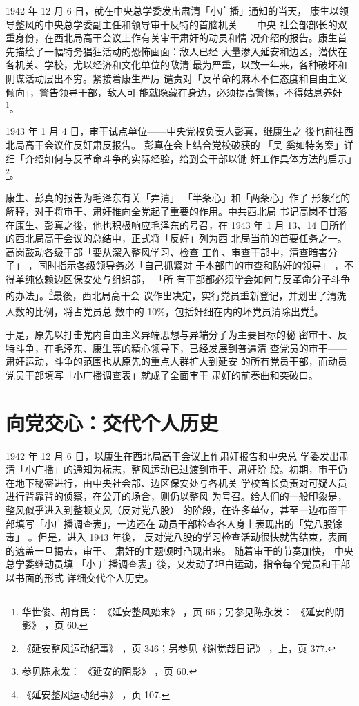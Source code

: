 1942 年 12 月 6 日，就在中央总学委发出肃清「小广播」通知的当天，
康生以领导整风的中央总学委副主任和领导审干反特的首脑机关——中央
社会部部长的双重身份，在西北局高干会议上作有关审干肃奸的动员和情
况介绍的报告。康生首先描绘了一幅特务猖狂活动的恐怖画面：敌人已经
大量渗入延安和边区，潜伏在各机关、学校，尤以经济和文化单位的敌清
最为严重，以致一年来，各种破坏和阴谋活动层出不穷。紧接着康生严厉
谴责对「反革命的麻木不仁态度和自由主义倾向」，警告领导干部，敌人可
能就隐藏在身边，必须提高警惕，不得姑息养奸\footnote{华世俊、胡育民：
《延安整风始末》
，页 66；另参见陈永发：
《延安的阴影》
，页 60.}。

1943 年 1 月 4 日，审干试点单位——中央党校负责人彭真，继康生之
後也前往西北局高干会议作反奸肃反报告。
彭真在会上结合党校破获的
「吴
奚如特务案」详细「介绍如何与反革命斗争的实际经验，给到会干部以锄
奸工作具体方法的启示」\footnote{《延安整风运动纪事》
，页 346；另参见《谢觉哉日记》
，上，页 377.}。

康生、彭真的报告为毛泽东有关「弄清」
「半条心」和「两条心」作了
形象化的解释，对于将审干、肃奸推向全党起了重要的作用。中共西北局
书记高岗不甘落在康生、彭真之後，他也积极响应毛泽东的号召，在 1943
年 1 月 13、14 日所作的西北局高干会议的总结中，正式将「反奸」列为西
北局当前的首要任务之一。高岗鼓动各级干部「要从深入整风学习、检查
工作、审查干部中，清查暗害分子」
，同时指示各级领导务必「自己抓紧对
于本部门的审查和防奸的领导」
，不得单纯依赖边区保安处与组织部，
「所
有干部都必须学会如何与反革命分子斗争的办法」。\footnote{参见陈永发：
《延安的阴影》
，页 60.}最後，西北局高干会
议作出决定，实行党员重新登记，并划出了清洗人数的比例，将占党员总
数中的 10\%，包括奸细在内的坏党员清除出党\footnote{《延安整风运动纪事》
，页 107.}。

于是，原先以打击党内自由主义异端思想与异端分子为主要目标的秘
密审干、反特斗争，在毛泽东、康生等的精心领导下，已经发展到普遍清
查党员的审干——肃奸运动，斗争的范围也从原先的重点人群扩大到延安
的所有党员干部，而动员党员干部填写「小广播调查表」就成了全面审干
肃奸的前奏曲和突破口。

\section{向党交心：交代个人历史}
1942 年 12 月 6 日，以康生在西北局高干会议上作肃奸报告和中央总
学委发出肃清「小广播」的通知为标志，整风运动已过渡到审干、肃奸阶
段。初期，审干仍在地下秘密进行，由中央社会部、边区保安处与各机关
学校首长负责对可疑人员进行背靠背的侦察，在公开的场合，则仍以整风
为号召。给人们的一般印象是，整风似乎进入到整顿文风（反对党八股）
的阶段，在许多单位，甚至一边布置干部填写「小广播调查表」，一边还在
动员干部检查各人身上表现出的「党八股馀毒」
。但是，进入 1943 年後，
反对党八股的学习检查活动很快就告结束，表面的遮盖一旦揭去，审干、
肃奸的主题顿时凸现出来。
随着审干的节奏加快，
中央总学委继动员填
「小
广播调查表」後，又发动了坦白运动，指令每个党员和干部以书面的形式
详细交代个人历史。

